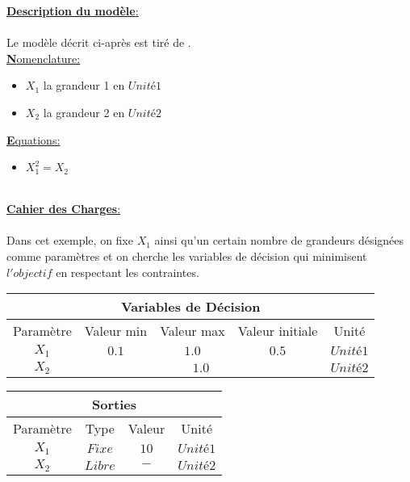 \documentclass[a4paper,12pt]{article}
\begin{document}
\begin{center}
\end{center}
\bigskip

\large{\underline{\textbf{Description du modèle}:}}\\\\\normalsize
Le modèle décrit ci-après est tiré de \cite{Doc1}. \\

\underline{\textbf Nomenclature:}
\begin{itemize}
	\item $ X_{1} $ la grandeur 1 en $ Unité 1 $
	\item $ X_{2} $ la grandeur 2 en $ Unité 2 $\\
\end{itemize}

\underline{\textbf Equations:}
\begin{itemize}
	\item $ X_{1}^{2} = X_{2} $\\\\
\end{itemize}

\large{\underline{\textbf{Cahier des Charges}:}}\\\\\normalsize
Dans cet exemple, on fixe $ X_{1} $ ainsi qu'un certain nombre de grandeurs désignées comme paramètres et on cherche les variables de décision qui minimisent $ l'objectif $ en respectant les contraintes.\\

\begin{center}
\begin{tabular}{|c|c|c|c|c|}
 \hline
 \multicolumn{5}{|c|}{Variables de Décision} \\
 \hline
 Paramètre & Valeur min & Valeur max & Valeur initiale & Unité\\
 \hline
 $ X_{1} $ & $ 0.1 $ & $ 1.0 $ & $ 0.5 $ & $ Unité 1 $\\
 \hline
 $ X_{2} $ & \multicolumn{3}{c|}{$ 1.0 $} & $ Unité 2 $ \\
 \hline
\end{tabular}
\end{center}

\begin{center}
\begin{tabular}{|c|c|c|c|}
 \hline
 \multicolumn{4}{|c|}{Sorties} \\
 \hline
 Paramètre & Type & Valeur & Unité\\
 \hline
 $ X_{1} $ & $ Fixe $ & $ 10 $ & $ Unité 1 $\\
 \hline
 $ X_{2} $ & $ Libre $ & $ - $ & $ Unité 2 $\\
 \hline
\end{tabular}
\end{center}
\end{document}
